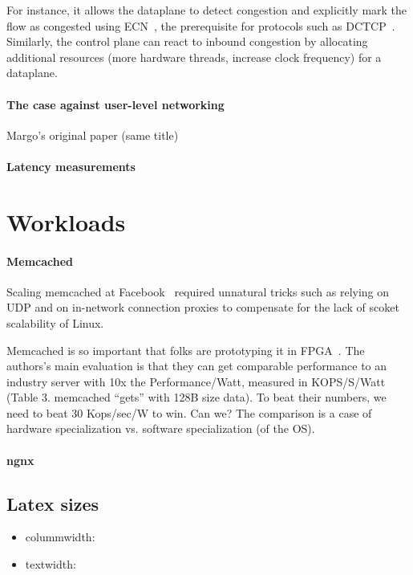 For instance, it allows the dataplane to detect
congestion and explicitly mark the flow as congested using
ECN~\cite{ramakrishnan2001addition}, the prerequisite for protocols
such as DCTCP~\cite{DBLP:conf/sigcomm/AlizadehGMPPPSS10}. Similarly,
the control plane can react to inbound congestion by allocating
additional resources (more hardware threads, increase clock frequency)
for a dataplane.




\paragraph{The case against user-level networking}
Margo's original paper (same title)~\cite{magoutis2004case}

\paragraph*{Latency measurements}  

\section{Workloads}

\paragraph*{Memcached} 
Scaling memcached at Facebook~\cite{nishtala2013scaling} required
unnatural tricks such as relying on UDP and on in-network connection
proxies to compensate for the lack of scoket scalability of Linux.

Memcached is so important that folks are prototyping it in
FPGA~\cite{DBLP:conf/fpga/ChalamalasettiLWARM13}.  The authors's main evaluation is
that they can get comparable performance to an industry server with
10x the Performance/Watt, measured in KOPS/S/Watt (Table 3. memcached
``gets'' with 128B size data). To beat their numbers, we need to beat
30 Kops/sec/W to win.  Can we?  The comparison is a case of hardware
specialization vs. software specialization (of the OS).



\paragraph*{ngnx}

\subsection{Latex sizes}

\begin{itemize}

\item colummwidth: \the\columnwidth
\item textwidth:  \the\textwidth
\end{itemize}
